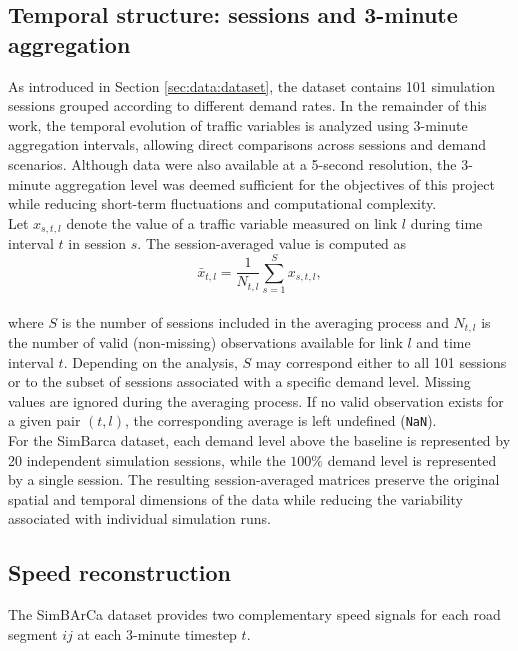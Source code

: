 \documentclass[11pt,a4paper]{article}
\begin{document}
\subsection{Temporal structure: sessions and 3-minute aggregation}
\label{sec:data:temporal}
As introduced in Section \ref{sec:data:dataset}, the dataset contains 101 simulation sessions grouped according to different demand rates. In the remainder of this work, the temporal evolution of traffic variables is analyzed using 3-minute aggregation intervals, allowing direct comparisons across sessions and demand scenarios. Although data were also available at a 5-second resolution, the 3-minute aggregation level was deemed sufficient for the objectives of this project while reducing short-term fluctuations and computational complexity.\\
Let \(x_{s,t,l}\) denote the value of a traffic variable measured on link \(l\) during time interval \(t\) in session \(s\). The session-averaged value is computed as
\begin{equation}
\bar{x}_{t,l} =
\frac{1}{N_{t,l}}
\sum_{s=1}^{S}
x_{s,t,l},
\end{equation}\\
where \(S\) is the number of sessions included in the averaging process and \(N_{t,l}\) is the number of valid (non-missing) observations available for link \(l\) and time interval \(t\). Depending on the analysis, \(S\) may correspond either to all 101 sessions or to the subset of sessions associated with a specific demand level. Missing values are ignored during the averaging process. If no valid observation exists for a given pair \((t,l)\), the corresponding average is left undefined (\texttt{NaN}).\\
For the SimBarca dataset, each demand level above the baseline is represented by 20 independent simulation sessions, while the \(100\%\) demand level is represented by a single session. The resulting session-averaged matrices preserve the original spatial and temporal dimensions of the data while reducing the variability associated with individual simulation runs.

\subsection{Speed reconstruction}
\label{sec:data:speed}

The SimBArCa dataset provides two complementary speed signals for each road segment
$ij$ at each 3-minute timestep $t$.
\end{document}
